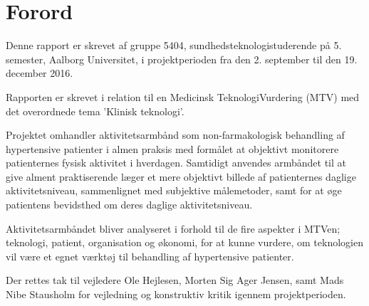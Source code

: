 \chapter*{Forord}

Denne rapport er skrevet af gruppe 5404, sundhedsteknologistuderende på 5. semester, Aalborg Universitet, i projektperioden fra den 2. september til den 19. december 2016.

Rapporten er skrevet i relation til en Medicinsk TeknologiVurdering (MTV) med det overordnede tema 'Klinisk teknologi'. 

Projektet omhandler aktivitetsarmbånd som non-farmakologisk behandling af hypertensive patienter i almen praksis med formålet at objektivt monitorere patienternes fysisk aktivitet i hverdagen. Samtidigt anvendes armbåndet til at give alment praktiserende læger et mere objektivt billede af patienternes daglige aktivitetsniveau, sammenlignet med subjektive målemetoder, samt for at øge patientens bevidsthed om deres daglige aktivitetsniveau. 

Aktivitetsarmbåndet bliver analyseret i forhold til de fire aspekter i MTVen; teknologi, patient, organisation og økonomi, for at kunne vurdere, om teknologien vil være et egnet værktøj til behandling af hypertensive patienter.

Der rettes tak til vejledere Ole Hejlesen, Morten Sig Ager Jensen, samt Mads Nibe Stausholm for vejledning og konstruktiv kritik igennem projektperioden. 
